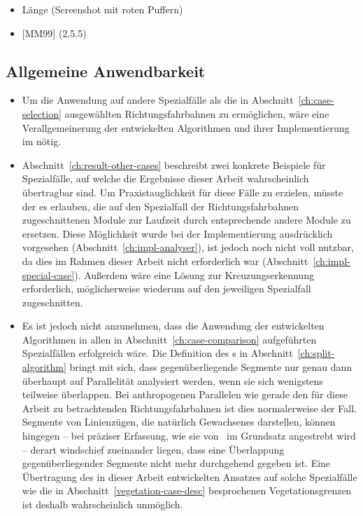 \documentclass[../main/thesis.tex]{subfiles}
\begin{document}
\begin{itemize}
\item Länge (Screenshot mit roten Puffern)

\item {[MM99]} (2.5.5)

\end{itemize}



\subsection{Allgemeine Anwendbarkeit}

\begin{itemize}

\item
Um die Anwendung auf andere Spezialfälle als die in Abschnitt~\ref{ch:case-selection} ausgewählten Richtungsfahrbahnen zu ermöglichen, wäre eine Verallgemeinerung der entwickelten Algorithmen und ihrer Implementierung im  nötig.

\item
Abschnitt~\ref{ch:result-other-cases} beschreibt zwei konkrete Beispiele für Spezialfälle, auf welche die Ergebnisse dieser Arbeit wahrscheinlich übertragbar sind.
Um Praxistauglichkeit für diese Fälle zu erzielen, müsste der  es erlauben, die auf den Spezialfall der Richtungsfahrbahnen zugeschnittenen Module zur Laufzeit durch entsprechende andere Module zu ersetzen.
Diese Möglichkeit wurde bei der Implementierung ausdrücklich vorgesehen (Abschnitt~\ref{ch:impl-analyser}), ist jedoch noch nicht voll nutzbar, da dies im Rahmen dieser Arbeit nicht erforderlich war (Abschnitt~\ref{ch:impl-special-case}).
Außerdem wäre eine Lösung zur Kreuzungserkennung erforderlich, möglicherweise wiederum auf den jeweiligen Spezialfall zugeschnitten.

\item
Es ist jedoch nicht anzunehmen, dass die Anwendung der entwickelten Algorithmen in allen in Abschnitt~\ref{ch:case-comparison} aufgeführten Spezialfällen erfolgreich wäre.
Die Definition des s in Abschnitt~\ref{ch:split-algorithm} bringt mit sich, dass gegenüberliegende Segmente nur genau dann überhaupt auf Parallelität analysiert werden, wenn sie sich wenigstens teilweise überlappen.
Bei anthropogenen Parallelen wie gerade den für diese Arbeit zu betrachtenden Richtungsfahrbahnen ist dies normalerweise der Fall.
Segmente von Linienzügen, die natürlich Gewachsenes darstellen, können hingegen -- bei präziser Erfassung, wie sie von \osm\ im Grundsatz angestrebt wird -- derart windschief zueinander liegen, dass eine Überlappung gegenüberliegender Segmente nicht mehr durchgehend gegeben ist.
Eine Übertragung des in dieser Arbeit entwickelten Ansatzes auf solche Spezialfälle wie die in Abschnitt~\ref{vegetation-case-desc} besprochenen Vegetationsgrenzen ist deshalb wahrscheinlich unmöglich.

\end{itemize}
\end{document}
